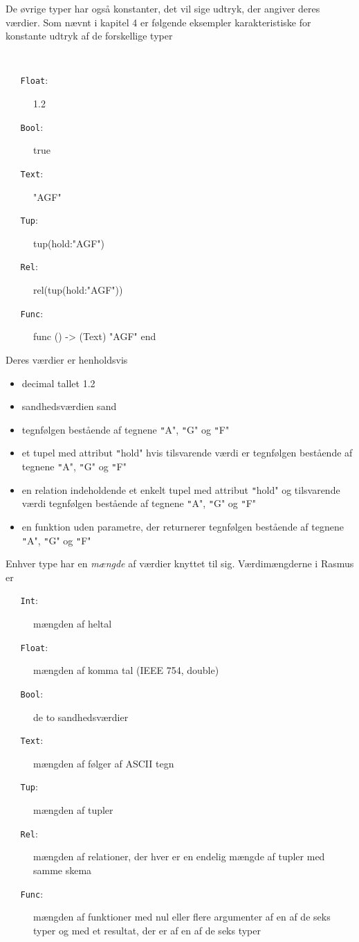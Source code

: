 \documentclass{article}
\newcounter{eks}
\begin{document}
De \o{}vrige typer har ogs\aa{} konstanter, det vil sige udtryk,
der angiver deres v\ae{}rdier. Som n\ae{}vnt i kapitel 4 er
f\o{}lgende eksempler karakteristiske for konstante udtryk af de
forskellige typer
{\tt
  \begin{description}%
  \item[{\tt ~~~Float}:] 1.2
\item[{\tt ~~~Bool}:] true 
\item[{\tt ~~~Text}:] "AGF"
\item[{\tt ~~~Tup}:] tup(hold:"AGF")
\item[{\tt ~~~Rel}:] rel(tup(hold:"AGF"))
\item[{\tt ~~~Func}:] func () -> (Text) "AGF" end
\end{description}
}
Deres v\ae{}rdier er henholdsvis
\begin{itemize}
\item decimal tallet 1.2
\item sandhedsv\ae{}rdien sand
\item tegnf\o{}lgen best\aa{}ende af tegnene \texttt"A", \texttt"G" og \texttt"F"
\item et tupel med attribut \texttt"hold" hvis tilsvar\-en\-de v\ae{}rdi er
tegnf\o{}lgen best\aa{}\-en\-de af tegnene \texttt"A", \texttt"G" og \texttt"F"
\item en relation indeholdende et enkelt tupel med attribut \texttt"hold" og
til\-svar\-en\-de v\ae{}rdi
tegnf\o{}lgen best\aa{}ende af tegnene \texttt"A", \texttt"G" og \texttt"F"
\item en funktion uden parametre, der returnerer tegnf\o{}lgen best\aa{}\-en\-de 
af tegnene \texttt"A", \texttt"G" og \texttt"F"
\end{itemize}
Enhver type har en {\em m\ae{}ngde\/} af v\ae{}rdier knyttet til sig.
V\ae{}rdim\ae{}ngderne i {\sc Rasmus} er
\begin{description}%
\item[{\tt ~~~Int}:] m\ae{}ngden af heltal
\item[{\tt ~~~Float}:] m\ae{}ngden af komma tal (IEEE 754, double)
\item[{\tt ~~~Bool}:] de to sandhedsv\ae{}rdier
\item[{\tt ~~~Text}:] m\ae{}ngden af f\o{}lger af ASCII tegn
\item[{\tt ~~~Tup}:] m\ae{}ngden af tupler
\item[{\tt ~~~Rel}:] m\ae{}ngden af relationer, der hver er en endelig
m\ae{}ngde af tupler med samme skema
\item[{\tt ~~~Func}:] m\ae{}ngden af funktioner med nul eller flere
argumenter af en af de seks typer og med et resultat, der er af en af de seks
typer
\end{description}
\end{document}
